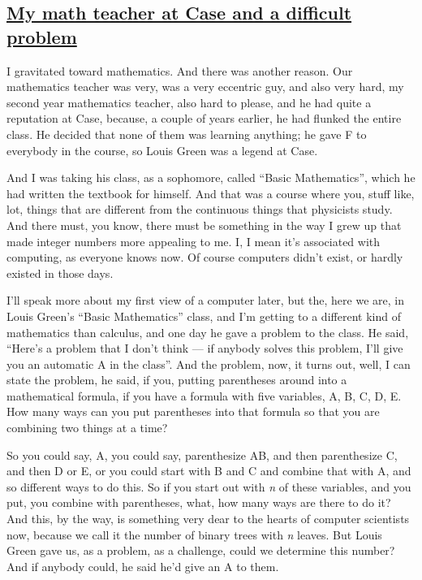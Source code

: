 \documentclass[]{article}
\begin{document}
\subsection{\texorpdfstring{\href{http://webofstories.com/play/17077}{My
math teacher at Case and a difficult
problem}}{My math teacher at Case and a difficult problem}}\label{my-math-teacher-at-case-and-a-difficult-problem}

I gravitated toward mathematics. And there was another reason. Our
mathematics teacher was very, was a very eccentric guy, and also very
hard, my second year mathematics teacher, also hard to please, and he
had quite a reputation at Case, because, a couple of years earlier, he
had flunked the entire class. He decided that none of them was learning
anything; he gave F to everybody in the course, so Louis Green was a
legend at Case.

And I was taking his class, as a sophomore, called ``Basic
Mathematics'', which he had written the textbook for himself. And that
was a course where you, stuff like, lot, things that are different from
the continuous things that physicists study. And there must, you know,
there must be something in the way I grew up that made integer numbers
more appealing to me. I, I mean it's associated with computing, as
everyone knows now. Of course computers didn't exist, or hardly existed
in those days.

I'll speak more about my first view of a computer later, but the, here
we are, in Louis Green's ``Basic Mathematics'' class, and I'm getting to
a different kind of mathematics than calculus, and one day he gave a
problem to the class. He said, ``Here's a problem that I don't think ---
if anybody solves this problem, I'll give you an automatic A in the
class''. And the problem, now, it turns out, well, I can state the
problem, he said, if you, putting parentheses around into a mathematical
formula, if you have a formula with five variables, A, B, C, D, E. How
many ways can you put parentheses into that formula so that you are
combining two things at a time?

So you could say, A, you could say, parenthesize AB, and then
parenthesize C, and then D or E, or you could start with B and C and
combine that with A, and so different ways to do this. So if you start
out with \emph{n} of these variables, and you put, you combine with
parentheses, what, how many ways are there to do it? And this, by the
way, is something very dear to the hearts of computer scientists now,
because we call it the number of binary trees with \emph{n} leaves. But
Louis Green gave us, as a problem, as a challenge, could we determine
this number? And if anybody could, he said he'd give an A to them.
\end{document}
